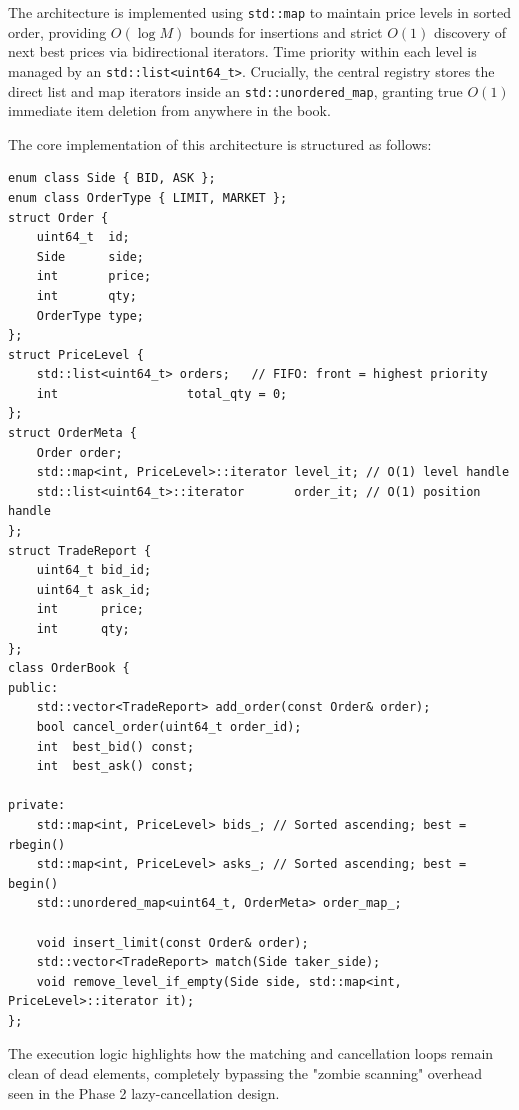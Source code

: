 \documentclass{article}
\begin{document}
The architecture is implemented using \texttt{std::map} to maintain price levels in sorted order, providing $O(\log M)$ bounds for insertions and strict $O(1)$ discovery of next best prices via bidirectional iterators. Time priority within each level is managed by an \texttt{std::list<uint64\_t>}. Crucially, the central registry stores the direct list and map iterators inside an \texttt{std::unordered\_map}, granting true $O(1)$ immediate item deletion from anywhere in the book.

The core implementation of this architecture is structured as follows:

\begin{lstlisting}[caption={Phase 3 Order Book Data Structures (orderbook.h)}]
enum class Side { BID, ASK };
enum class OrderType { LIMIT, MARKET };
struct Order {
    uint64_t  id;
    Side      side;
    int       price;
    int       qty;
    OrderType type;
};
struct PriceLevel {
    std::list<uint64_t> orders;   // FIFO: front = highest priority
    int                  total_qty = 0;
};
struct OrderMeta {
    Order order;
    std::map<int, PriceLevel>::iterator level_it; // O(1) level handle
    std::list<uint64_t>::iterator       order_it; // O(1) position handle
};
struct TradeReport {
    uint64_t bid_id;
    uint64_t ask_id;
    int      price;
    int      qty;
};
class OrderBook {
public:
    std::vector<TradeReport> add_order(const Order& order);
    bool cancel_order(uint64_t order_id);
    int  best_bid() const;
    int  best_ask() const;

private:
    std::map<int, PriceLevel> bids_; // Sorted ascending; best = rbegin()
    std::map<int, PriceLevel> asks_; // Sorted ascending; best = begin()
    std::unordered_map<uint64_t, OrderMeta> order_map_;

    void insert_limit(const Order& order);
    std::vector<TradeReport> match(Side taker_side);
    void remove_level_if_empty(Side side, std::map<int, PriceLevel>::iterator it);
};
\end{lstlisting}

The execution logic highlights how the matching and cancellation loops remain clean of dead elements, completely bypassing the "zombie scanning" overhead seen in the Phase 2 lazy-cancellation design.
\end{document}
